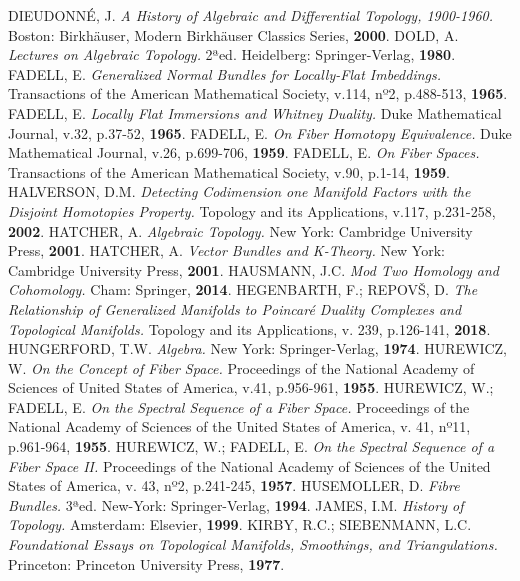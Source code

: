 \documentclass[12pt,oneside]{book} %
\begin{document}
\begin{thebibliography}{99}
	 DIEUDONNÉ, J. \textit{A History of Algebraic and Differential Topology, 1900-1960.} Boston: Birkhäuser, Modern Birkhäuser Classics Series, \textbf{2000}.
	 DOLD, A. \textit{Lectures on Algebraic Topology.} 2ªed. Heidelberg: Springer-Verlag, \textbf{1980}.
	 FADELL, E. \textit{Generalized Normal Bundles for Locally-Flat Imbeddings.} Transactions of the American Mathematical Society, v.114, nº2, p.488-513, \textbf{1965}.
	 FADELL, E. \textit{Locally Flat Immersions and Whitney Duality.} Duke Mathematical Journal, v.32, p.37-52, \textbf{1965}.
	 FADELL, E. \textit{On Fiber Homotopy Equivalence.} Duke Mathematical Journal, v.26, p.699-706, \textbf{1959}.
	 FADELL, E. \textit{On Fiber Spaces.} Transactions of the American Mathematical Society, v.90, p.1-14, \textbf{1959}.
	 HALVERSON, D.M. \textit{Detecting Codimension one Manifold Factors with the Disjoint Homotopies Property.} Topology and its Applications, v.117, p.231-258, \textbf{2002}.
	 HATCHER, A. \textit{Algebraic Topology.} New York: Cambridge University Press, \textbf{2001}.
	 HATCHER, A. \textit{Vector Bundles and K-Theory.} New York: Cambridge University Press, \textbf{2001}.
	 HAUSMANN, J.C. \textit{Mod Two Homology and Cohomology.} Cham: Springer, \textbf{2014}.
	 HEGENBARTH, F.; REPOV\v{S}, D. \textit{The Relationship of Generalized Manifolds to Poincaré Duality Complexes and Topological Manifolds.} Topology and its Applications, v. 239, p.126-141, \textbf{2018}.
	 HUNGERFORD, T.W. \textit{Algebra.} New York: Springer-Verlag, \textbf{1974}.
	 HUREWICZ, W. \textit{On the Concept of Fiber Space.} Proceedings of the National Academy of Sciences of United States of America, v.41, p.956-961, \textbf{1955}.
	 HUREWICZ, W.; FADELL, E. \textit{On the Spectral Sequence of a Fiber Space.} Proceedings of the National Academy of Sciences of the United States of America, v. 41, nº11, p.961-964, \textbf{1955}.
	 HUREWICZ, W.; FADELL, E. \textit{On the Spectral Sequence of a Fiber Space II.} Proceedings of the National Academy of Sciences of the United States of America, v. 43, nº2, p.241-245, \textbf{1957}.
	 HUSEMOLLER, D. \textit{Fibre Bundles.} 3ªed. New-York: Springer-Verlag, \textbf{1994}.
	 JAMES, I.M. \textit{History of Topology.} Amsterdam: Elsevier, \textbf{1999}.
	 KIRBY, R.C.; SIEBENMANN, L.C. \textit{Foundational Essays on Topological Manifolds, Smoothings, and Triangulations.} Princeton: Princeton University Press, \textbf{1977}.

\end{thebibliography}
\end{document}
